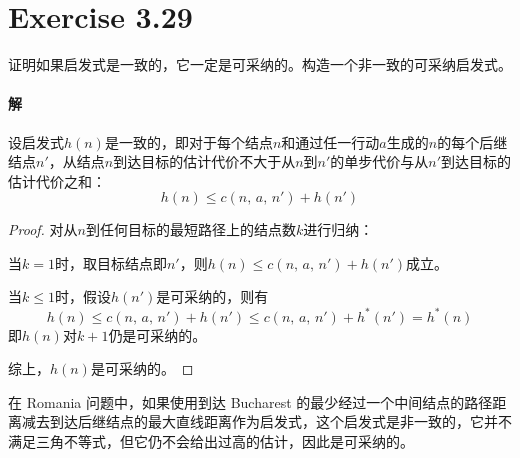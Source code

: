 \documentclass{article}
\begin{document}
\section{Exercise 3.29}
证明如果启发式是一致的，它一定是可采纳的。构造一个非一致的可采纳启发式。

\paragraph{解}
设启发式$h(n)$是一致的，即对于每个结点$n$和通过任一行动$a$生成的$n$的每个后继结点$n'$，从结点$n$到达目标的估计代价不大于从$n$到$n'$的单步代价与从$n'$到达目标的估计代价之和：$$h(n) \leqslant c(n,\, a,\, n') + h(n')$$
\begin{proof}
    对从$n$到任何目标的最短路径上的结点数$k$进行归纳：

    当$k = 1$时，取目标结点即$n'$，则$h(n) \leqslant c(n,\, a,\, n') + h(n')$成立。

    当$k \leqslant 1$时，假设$h(n')$是可采纳的，则有
    \begin{equation*}
        h(n) \leqslant c(n,\, a,\, n') + h(n') \leqslant c(n,\, a,\, n') + h^*(n') = h^*(n)
    \end{equation*}
    即$h(n)$对$k + 1$仍是可采纳的。

    综上，$h(n)$是可采纳的。
\end{proof}
在 Romania 问题中，如果使用到达 Bucharest 的最少经过一个中间结点的路径距离减去到达后继结点的最大直线距离作为启发式，这个启发式是非一致的，它并不满足三角不等式，但它仍不会给出过高的估计，因此是可采纳的。
\end{document}
